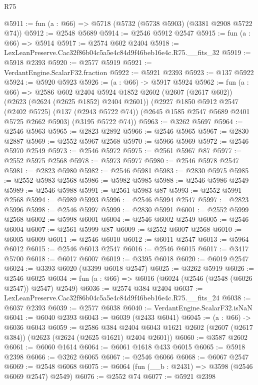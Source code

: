 \begin{lexlean}{R75}
\begin{coremodule}
@5911 := fun (a : @66) => @5718 (@5732 (@5738 @5903) (@3381 @2908 @5722 @74))
@5912 := @2548 @5689
@5914 := @2546 @5912 @2547
@5915 := fun (a : @66) => @5914
@5917 := @2574 @602 @2404
@5918 := LexLeanPreserve.Cac32f86b04c5a5e4c84d9f46beb16e4c.R75.__fits_32
@5919 := @5918 @2393
@5920 := @2577 @5919
@5921 := VerdantEngine.ScalarF32.fraction
@5922 := @5921 @2393
@5923 := @137 @5922
@5924 := @5920 @5923
@5926 := (a : @66) -> @5917 @5924
@5962 := fun (a : @66) =>
  @2586
    @602
    @2404
    @5924
    @1852
    @2602
    (@2607 (@2617 @602))
    (@2623 (@2624 (@2625 @1852) @2404 @2601))
    (@2927
      @1850
      @5912
      @2547
      (@2402 @5725)
      (@137 (@2943 @5722 @74))
      (@2645 @1585 @2547 @5689 @2401 @5725 @2662 @5903)
      (@3195 @5722 @74))
@5963 := @3262 @5697
@5964 := @2546 @5963
@5965 := @2823 @2892
@5966 := @2546 @5965
@5967 := @2830 @2887
@5969 := @2552 @5967 @2568
@5970 := @5966 @5969
@5972 := @2546 @5970 @2549
@5973 := @2546 @5972
@5975 := @2561 @5967 @87
@5977 := @2552 @5975 @2568
@5978 := @5973 @5977
@5980 := @2546 @5978 @2547
@5981 := @2823 @5980
@5982 := @2546 @5981
@5983 := @2830 @5975
@5985 := @2552 @5983 @2568
@5986 := @5982 @5985
@5988 := @2546 @5986 @2549
@5989 := @2546 @5988
@5991 := @2561 @5983 @87
@5993 := @2552 @5991 @2568
@5994 := @5989 @5993
@5996 := @2546 @5994 @2547
@5997 := @2823 @5996
@5998 := @2546 @5997
@5999 := @2830 @5991
@6001 := @2552 @5999 @2568
@6002 := @5998 @6001
@6004 := @2546 @6002 @2549
@6005 := @2546 @6004
@6007 := @2561 @5999 @87
@6009 := @2552 @6007 @2568
@6010 := @6005 @6009
@6011 := @2546 @6010
@6012 := @6011 @2547
@6013 := @5964 @6012
@6015 := @2546 @6013 @2547
@6016 := @2546 @6015
@6017 := @3417 @5700
@6018 := @6017 @6007
@6019 := @3395 @6018
@6020 := @6019 @2547
@6024 := @3393 @6020 (@3399 @6018 @2547)
@6025 := @3262 @5919
@6026 := @2546 @6025
@6034 := fun (a : @66) => @6016 (@6024 (@2546 (@2548 (@6026 @2547)) @2547) @2549)
@6036 := @2574 @384 @2404
@6037 := LexLeanPreserve.Cac32f86b04c5a5e4c84d9f46beb16e4c.R75.__fits_24
@6038 := @6037 @2393
@6039 := @2577 @6038
@6040 := VerdantEngine.ScalarF32.isNaN
@6041 := @6040 @2393
@6043 := @6039 (@2433 @6041)
@6045 := (a : @66) -> @6036 @6043
@6059 := @2586
    @384
    @2404
    @6043
    @1621
    @2602
    (@2607 (@2617 @384))
    (@2623 (@2624 (@2625 @1621) @2404 @2601))
@6060 := @3587 @2602
@6061 := @6060 @1614
@6064 := @6061 @1618 @433 @6015
@6065 := @5918 @2398
@6066 := @3262 @6065
@6067 := @2546 @6066
@6068 := @6067 @2547
@6069 := @2548 @6068
@6075 := @6064 (fun (__b : @2431) => @3598 (@2546 @6069 @2547) @2549)
@6076 := @2552 @74
@6077 := @5921 @2398

\end{coremodule}
\end{lexlean}
